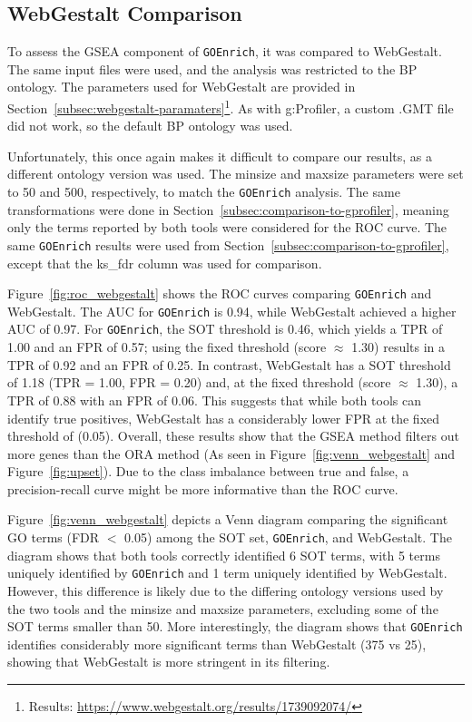\documentclass{article}
\begin{document}
    \subsection{WebGestalt Comparison}\label{subsec:webgestalt-comparison}
    To assess the GSEA component of \texttt{GOEnrich}, it was compared to WebGestalt\cite{elizarraras_liao_shi_zhu_pico_zhang_2024}. The same input files were used, and the analysis was restricted to the BP ontology. The parameters used for WebGestalt are provided in Section~\ref{subsec:webgestalt-paramaters}\footnote{Results: \url{https://www.webgestalt.org/results/1739092074/}}. As with g:Profiler, a custom .GMT file did not work, so the default BP ontology was used.

    Unfortunately, this once again makes it difficult to compare our results, as a different ontology version was used. The minsize and maxsize parameters were set to 50 and 500, respectively, to match the \texttt{GOEnrich} analysis. The same transformations were done in Section~\ref{subsec:comparison-to-gprofiler}, meaning only the terms reported by both tools were considered for the ROC curve. The same \texttt{GOEnrich} results were used from Section~\ref{subsec:comparison-to-gprofiler}, except that the ks\_fdr column was used for comparison.

    Figure~\ref{fig:roc_webgestalt} shows the ROC curves comparing \texttt{GOEnrich} and WebGestalt. The AUC for \texttt{GOEnrich} is 0.94, while WebGestalt achieved a higher AUC of 0.97. For \texttt{GOEnrich}, the SOT threshold is 0.46, which yields a TPR of 1.00 and an FPR of 0.57; using the fixed threshold (score $\approx$ 1.30) results in a TPR of 0.92 and an FPR of 0.25. In contrast, WebGestalt has a SOT threshold of 1.18 (TPR = 1.00, FPR = 0.20) and, at the fixed threshold (score $\approx$ 1.30), a TPR of 0.88 with an FPR of 0.06. This suggests that while both tools can identify true positives, WebGestalt has a considerably lower FPR at the fixed threshold of (0.05). Overall, these results show that the GSEA method filters out more genes than the ORA method (As seen in Figure~\ref{fig:venn_webgestalt} and Figure~\ref{fig:upset}). Due to the class imbalance between true and false, a precision-recall curve might be more informative than the ROC curve.

    Figure~\ref{fig:venn_webgestalt} depicts a Venn diagram comparing the significant GO terms (FDR $<$ 0.05) among the SOT set, \texttt{GOEnrich}, and WebGestalt. The diagram shows that both tools correctly identified 6 SOT terms, with 5 terms uniquely identified by \texttt{GOEnrich} and 1 term uniquely identified by WebGestalt. However, this difference is likely due to the differing ontology versions used by the two tools and the minsize and maxsize parameters, excluding some of the SOT terms smaller than 50. More interestingly, the diagram shows that \texttt{GOEnrich} identifies considerably more significant terms than WebGestalt (375 vs 25), showing that WebGestalt is more stringent in its filtering.
\end{document}
